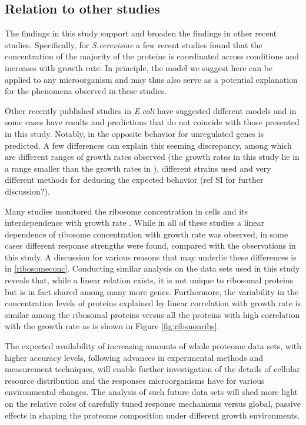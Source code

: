 \subsection{Relation to other studies}
The findings in this study support and broaden the findings in other recent studies.
Specifically, for \emph{S.cerevisiae} a few recent studies found that the concentration of the majority of the proteins is coordinated across conditions \cite{Keren2013a,Gasch2000,Brauer2008a} and increases with growth rate.
In principle, the model we suggest here can be applied to any microorganism and may thus also serve as a potential explanation for the phenomena observed in these studies.


Other recently published studies in \emph{E.coli} have suggested different models and in some cases have results  and predictions that do not coincide with those presented in this study.
Notably, in \cite{Klumpp2009a} the opposite behavior for unregulated genes is predicted.
A few differences can explain this seeming discrepancy, among which are different ranges of growth rates observed (the growth rates in this study lie in a range smaller than the growth rates in \cite{Klumpp2009a}), different strains used and very different methods for deducing the expected behavior (ref SI for further discussion?).


Many studies monitored the ribosome concentration in cells and its interdependence with growth rate \cite{Scott2010,Bremer1987,Schaechter1958,1974,Zaslaver2009,Bremer1987}.
While in all of these studies a linear dependence of ribosome concentration with growth rate was observed, in some cases different response strengths were found, compared with the observations in this study.
A discussion for various reasons that may underlie these differences is in \ref{ribosomeconc}.
Conducting similar analysis on the data sets used in this study reveals that, while a linear relation exists, it is not unique to ribosomal proteins but is in fact shared among many more genes.
Furthermore, the variability in the concentration levels of proteins explained by linear correlation with growth rate is similar among the ribosomal proteins versus all the proteins with high correlation with the growth rate as is shown in Figure \ref{fig:ribsnonribs}.

The expected availability of increasing amounts of whole proteome data sets, with higher accuracy levels, following advances in experimental methods and measurement techniques, will enable further investigation of the details of cellular resource distribution and the responses microorganisms have for various environmental changes.
The analysis of such future data sets will shed more light on the relative roles of carefully tuned response mechanisms versus global, passive effects in shaping the proteome composition under different growth environments.